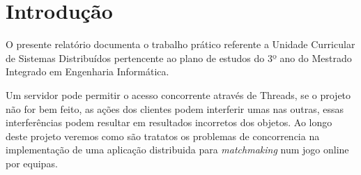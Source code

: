 \chapter{Introdução}
\label{cap:intro}

O presente relatório documenta o trabalho prático referente a Unidade Curricular de Sistemas Distribuídos pertencente ao plano de estudos do 3º ano do Mestrado Integrado em Engenharia Informática.

Um servidor pode permitir o acesso concorrente através de Threads, se o projeto não for bem feito, as ações dos clientes podem interferir umas nas outras, essas interferências podem resultar em resultados incorretos dos objetos. Ao longo deste projeto veremos como são tratatos os problemas de concorrencia na implementação de uma aplicação distribuida para \textit{matchmaking} num jogo online por equipas. 


